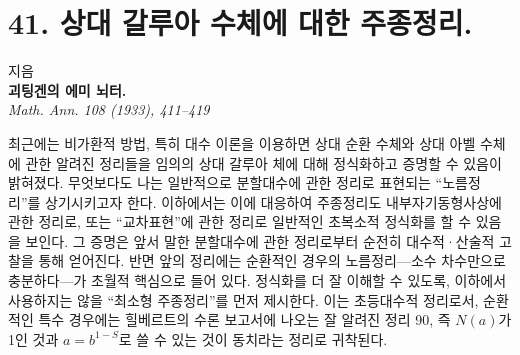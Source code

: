 
\section*{41. 상대 갈루아 수체에 대한 주종정리.}

\begin{center}
지음\\[0.4ex]
\textbf{괴팅겐의 에미 뇌터.}\\[0.8ex]
\emph{Math. Ann. 108 (1933), 411--419}
\end{center}

최근에는 비가환적 방법, 특히 대수 이론을 이용하면 상대 순환 수체와 상대 아벨 수체에 관한 알려진 정리들을 임의의 상대 갈루아 체에 대해 정식화하고 증명할 수 있음이 밝혀졌다. 무엇보다도 나는 일반적으로 분할대수에 관한 정리로 표현되는 ``노름정리''를 상기시키고자 한다. 이하에서는 이에 대응하여 주종정리도 내부자기동형사상에 관한 정리로, 또는 ``교차표현''에 관한 정리로 일반적인 초복소적 정식화를 할 수 있음을 보인다. 그 증명은 앞서 말한 분할대수에 관한 정리로부터 순전히 대수적·산술적 고찰을 통해 얻어진다. 반면 앞의 정리에는 순환적인 경우의 노름정리---소수 차수만으로 충분하다---가 초월적 핵심으로 들어 있다. 정식화를 더 잘 이해할 수 있도록, 이하에서 사용하지는 않을 ``최소형 주종정리''를 먼저 제시한다. 이는 초등대수적 정리로서, 순환적인 특수 경우에는 힐베르트의 수론 보고서에 나오는 잘 알려진 정리 90, 즉 \(N(a)\)가 1인 것과 \(a=b^{1-S}\)로 쓸 수 있는 것이 동치라는 정리로 귀착된다.


